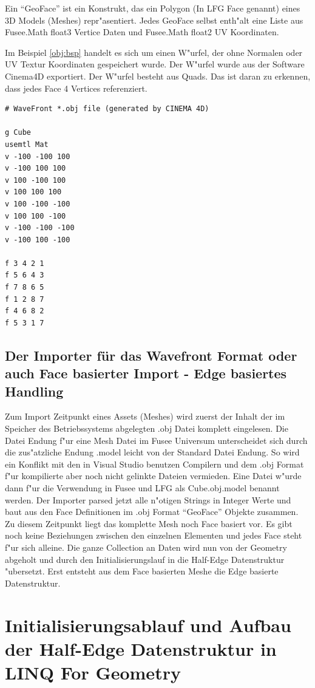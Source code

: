 \documentclass[pagesize, paper=a4, fontsize=12pt,titlepage=true, headings=small, headnosepline, abstractoff, liststotoc, nochapterprefix, plainheadsepline]{scrreprt}
\newcommand{\LFG}{LINQ For Geometry}
\newcommand{\HES}{Half-Edge Datenstruktur }
\begin{document}
Ein "`GeoFace"' ist ein Konstrukt, das ein Polygon (In LFG Face genannt) eines 3D Models (Meshes) repr"asentiert. Jedes GeoFace selbst enth"alt eine Liste aus Fusee.Math float3 Vertice Daten und Fusee.Math float2 UV Koordinaten.
\newline

Im Beispiel \ref{obj:bsp} handelt es sich um einen W"urfel, der ohne Normalen oder UV Textur Koordinaten gespeichert wurde. Der W"urfel wurde aus der Software Cinema4D exportiert. Der W"urfel besteht aus Quads. Das ist daran zu erkennen, dass jedes Face 4 Vertices referenziert.
\begin{lstlisting}
# WaveFront *.obj file (generated by CINEMA 4D)

g Cube
usemtl Mat
v -100 -100 100
v -100 100 100
v 100 -100 100
v 100 100 100
v 100 -100 -100
v 100 100 -100
v -100 -100 -100
v -100 100 -100

f 3 4 2 1 
f 5 6 4 3 
f 7 8 6 5 
f 1 2 8 7 
f 4 6 8 2 
f 5 3 1 7 
\end{lstlisting}\label{obj:bsp}

		\subsection {Der Importer für das Wavefront Format oder auch Face basierter Import - Edge basiertes Handling}
			Zum Import Zeitpunkt eines Assets (Meshes) wird zuerst der Inhalt der im Speicher des Betriebssystems abgelegten .obj Datei komplett eingelesen. Die Datei Endung f"ur eine Mesh Datei im Fusee Universum unterscheidet sich durch die zus"atzliche Endung .model leicht von der Standard Datei Endung. So wird ein Konflikt mit den in Visual Studio benutzen Compilern und dem .obj Format f"ur kompilierte aber noch nicht gelinkte Dateien vermieden. Eine Datei w"urde dann f"ur die Verwendung in Fusee und LFG als Cube.obj.model benannt werden. Der Importer parsed jetzt alle n"otigen Strings in Integer Werte und baut aus den Face Definitionen im .obj Format "`GeoFace"' Objekte zusammen. Zu diesem Zeitpunkt liegt das komplette Mesh noch Face basiert vor. Es gibt noch keine Beziehungen zwischen den einzelnen Elementen und jedes Face steht f"ur sich alleine. Die ganze Collection an Daten wird nun von der Geometry abgeholt und durch den Initialisierungslauf in die \HES "ubersetzt. Erst entsteht aus dem Face basierten Meshe die Edge basierte Datenstruktur.
	\section {Initialisierungsablauf und Aufbau der \HES in \LFG}
\end{document}
